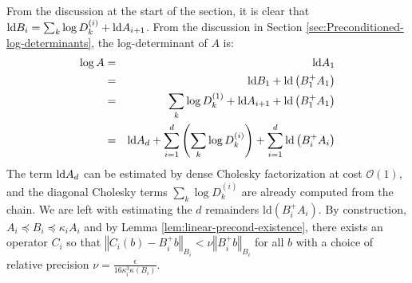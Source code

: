 From the discussion at the start of the section, it is clear that
$\text{\textnormal{ld}} B_{i}=\sum_{k}\log D_{k}^{\left(i\right)}+\text{\textnormal{ld}} A_{i+1}$. From
the discussion in Section \ref{sec:Preconditioned-log-determinants},
the log-determinant of $A$ is:
\begin{eqnarray*}
\log A & = & \text{\textnormal{ld}} A_{1}\\
 & = & \text{\textnormal{ld}} B_{1}+\text{\textnormal{ld}}\left(B_{1}^{+}A_{1}\right)\\
 & = & \sum_{k}\log D_{k}^{\left(1\right)}+\text{\textnormal{ld}} A_{i+1}+\text{\textnormal{ld}}\left(B_{1}^{+}A_{1}\right)\\
 & = & \text{\textnormal{ld}} A_{d}+\sum_{i=1}^{d}\left(\sum_{k}\log D_{k}^{\left(i\right)}\right)+\sum_{i=1}^{d}\text{\textnormal{ld}}\left(B_{i}^{+}A_{i}\right)
\end{eqnarray*}
The term $\text{\textnormal{ld}} A_{d}$ can be estimated by dense Cholesky factorization
at cost $\mathcal{O}\left(1\right)$, and the diagonal Cholesky terms
$\sum_{k}\log D_{k}^{\left(i\right)}$ are already computed from the
chain. We are left with estimating the $d$ remainders $\text{ld}\left(B_{i}^{+}A_{i}\right)$.
By construction, $A_{i}\preceq B_{i}\preceq\kappa_{i}A_{i}$ and by
Lemma \ref{lem:linear-precond-existence}, there exists an operator
$C_{i}$ so that $\left\Vert C_{i}\left(b\right)-B_{i}^{+}b\right\Vert _{B_{i}}<\nu\left\Vert B_{i}^{+}b\right\Vert _{B_{i}}$
for all $b$ with a choice of relative precision $\nu=\frac{\epsilon}{16\kappa_{i}^{3}\kappa\left(B_{i}\right)}$. 

